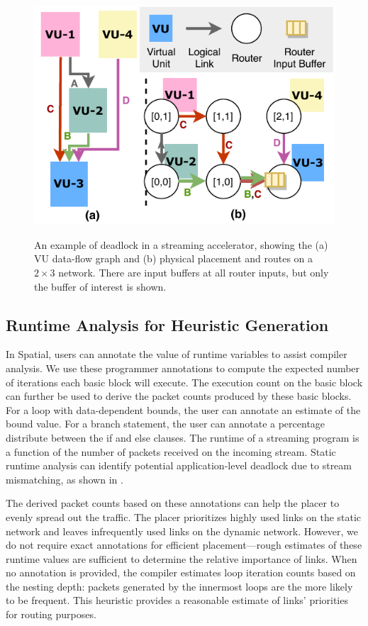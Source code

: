 \begin{figure}
\centering
\includegraphics[width=0.4\columnwidth]{figs/deadlock.pdf}
  \caption[Network deadlock in streaming accelerators]{An example of deadlock in a streaming accelerator, showing the (a) VU data-flow graph and (b) physical placement and routes on a $2\times3$ network. There are input buffers at all router inputs, but only the buffer of interest is shown.}\small\textsuperscript{}\label{fig:deadlock}
\end{figure}

\subsection{Runtime Analysis for Heuristic Generation} \label{sec:heuristic}

In Spatial, users can annotate the value of runtime variables to assist compiler analysis.  
We use these programmer annotations to compute the expected number of iterations each basic block
will execute. 
The execution count on the basic block can further be used to derive the packet counts produced
by these basic blocks.
For a loop with data-dependent bounds, the user can annotate an estimate of the bound value.
For a branch statement, the user can annotate a percentage distribute between the if and else clauses.
The runtime of a streaming program is a function of the number of packets received on the incoming
stream. 
Static runtime analysis can identify potential application-level deadlock due to stream mismatching, as shown
in .

The derived packet counts based on these annotations can help the placer to evenly spread out the traffic.
The placer prioritizes highly used links on the static network and leaves infrequently used links on the dynamic network. 
However, we do not require exact annotations for efficient placement---rough estimates of these runtime values are sufficient to determine the relative importance of links.
When no annotation is provided, the compiler estimates
loop iteration counts based on the nesting depth: packets generated by the innermost loops are 
the more likely to be frequent.
This heuristic provides a reasonable estimate of links' priorities for routing purposes.

